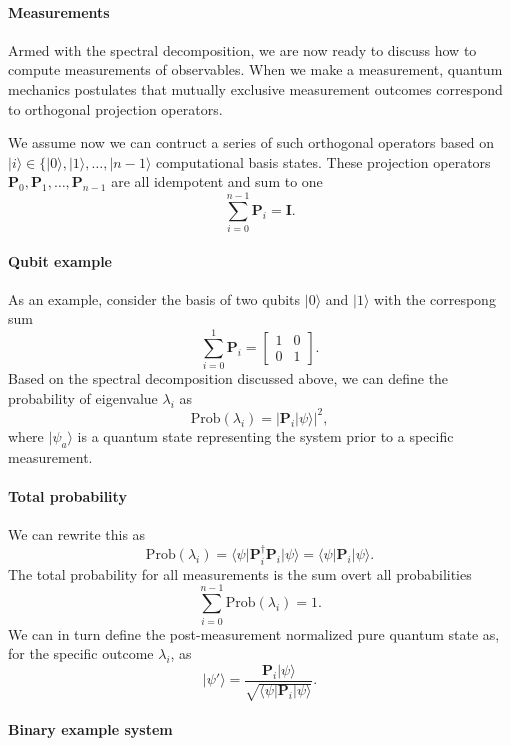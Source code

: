 \paragraph{Measurements}

Armed with the spectral decomposition, we are now ready to discuss how
to compute measurements of observables.  When we make a measurement,
quantum mechanics postulates that mutually exclusive measurement
outcomes correspond to orthogonal projection operators.

We assume now we can contruct a series of such orthogonal operators based on $\vert i \rangle \in \{\vert 0\rangle, \vert 1\rangle,\dots, \vert n-1\rangle$ computational basis states. These projection operators $\bm{P}_0,\bm{P}_1,\dots,\bm{P}_{n-1}$ are all idempotent and sum to one
\[
\sum_{i=0}^{n-1}\bm{P}_i=\bm{I}.
\]


\paragraph{Qubit example}

As an example, consider the basis of two qubits $\vert 0\rangle$ and $\vert 1\rangle$ with the correspong sum
\[
\sum_{i=0}^{1}\bm{P}_i=\begin{bmatrix} 1 & 0 \\ 0 & 1\end{bmatrix}.
\]
Based on the spectral decomposition discussed above, we can define the probability of eigenvalue $\lambda_i$ as
\[
\mathrm{Prob}(\lambda_i) = \vert \bm{P}_i\vert \psi\rangle\vert^2,
\]
where $\vert \psi_a\rangle$ is a quantum state representing the system prior to a specific measurement.


\paragraph{Total probability}

We can rewrite this as 
\[
\mathrm{Prob}(\lambda_i) = \langle \psi\vert \bm{P}_i^{\dagger}\bm{P}_i\vert \psi\rangle =\langle \psi\vert \bm{P}_i\vert \psi\rangle.
\]
The total probability for all measurements is the sum overt all probabilities
\[
\sum_{i=0}^{n-1}\mathrm{Prob}(\lambda_i)=1.
\]
We can in turn define the post-measurement normalized pure quantum state as, for the specific outcome $\lambda_i$, as
\[
\vert \psi'\rangle = \frac{\bm{P}_i\vert \psi\rangle}{\sqrt{\langle \psi \vert \bm{P}_i\vert \psi\rangle}}. 
\]


\paragraph{Binary example system}


